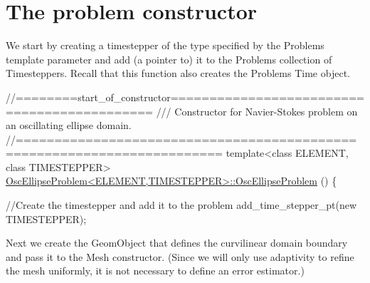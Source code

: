  

\hypertarget{index_constructor}{}\section{The problem constructor}\label{index_constructor}
We start by creating a timestepper of the type specified by the {\ttfamily Problem\textquotesingle{}s} template parameter and add (a pointer to) it to the {\ttfamily Problem\textquotesingle{}s} collection of {\ttfamily Timesteppers}. Recall that this function also creates the {\ttfamily Problem\textquotesingle{}s} {\ttfamily Time} object.


\begin{DoxyCodeInclude}



\textcolor{comment}{//========start\_of\_constructor============================================}\textcolor{comment}{}
\textcolor{comment}{/// Constructor for Navier-Stokes problem on an oscillating ellipse domain.}
\textcolor{comment}{}\textcolor{comment}{//========================================================================}
\textcolor{keyword}{template}<\textcolor{keyword}{class} ELEMENT, \textcolor{keyword}{class} TIMESTEPPER>
\hyperlink{classOscEllipseProblem_aaa836937ec963921243fcb990f6fe538}{OscEllipseProblem<ELEMENT,TIMESTEPPER>::OscEllipseProblem}
      ()
\{ 

 \textcolor{comment}{//Create the timestepper and add it to the problem}
 add\_time\_stepper\_pt(\textcolor{keyword}{new} TIMESTEPPER);

\end{DoxyCodeInclude}


Next we create the {\ttfamily Geom\+Object} that defines the curvilinear domain boundary and pass it to the Mesh constructor. (Since we will only use adaptivity to refine the mesh uniformly, it is not necessary to define an error estimator.)


